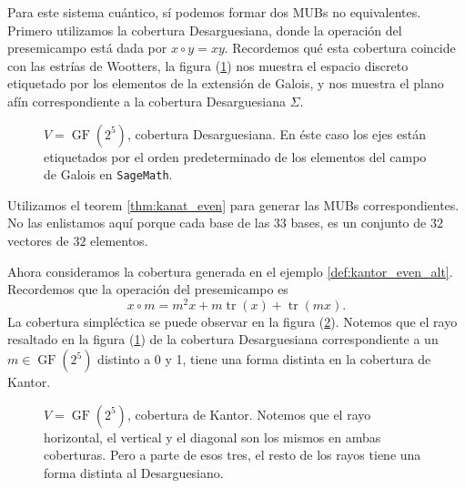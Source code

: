 \documentclass[a4paper,11pt]{report}
\DeclareMathOperator{\tr}{tr}
\DeclareMathOperator{\GF}{GF}
\begin{document}
  Para este sistema cuántico, sí podemos formar dos MUBs no
  equivalentes. Primero utilizamos la cobertura
  Desarguesiana, donde la operación del presemicampo está
  dada por $x \circ y = xy$.  Recordemos qué esta cobertura
  coincide con las estrías de Wootters, la figura
  (\ref{fig:2-5-desargues-plane}) nos muestra el espacio
  discreto etiquetado por los elementos de la extensión de
  Galois, y nos muestra el plano afín correspondiente a la
  cobertura Desarguesiana $\Sigma$.
  \begin{figure}[ht]
    \centering
    
    \caption{$V = \GF(2^{5})$, cobertura Desarguesiana. En éste
    caso los ejes están etiquetados por el orden
    predeterminado de los elementos del campo de Galois en
    \texttt{SageMath}.}
    \label{fig:2-5-desargues-plane}
  \end{figure}
  Utilizamos el teorem \ref{thm:kanat_even} para
  generar las MUBs correspondientes. No las enlistamos aquí
  porque cada base de las $33$ bases, es un conjunto de $32$ 
  vectores de $32$ elementos.

  Ahora consideramos la cobertura generada en el ejemplo
  \ref{def:kantor_even_alt}. Recordemos que la operación del
  presemicampo es
  \begin{equation}
    \label{eqn:kantor_presemi}
    x \circ m
    = m^2 x + m \tr(x) + \tr(mx).
  \end{equation} 
  La cobertura simpléctica se puede observar en la figura
  (\ref{fig:2-5-kantor-plane}).  Notemos que el rayo
  resaltado en la figura (\ref{fig:2-5-desargues-plane}) de
  la cobertura Desarguesiana correspondiente a un $m \in
  \GF(2^{5})$ distinto a 0 y 1, tiene una forma distinta en
  la cobertura de Kantor.
  \begin{figure}[ht]
    \centering
    
    \caption{$V = \GF(2^{5})$, cobertura de Kantor. Notemos
      que el rayo horizontal, el vertical y el diagonal son
      los mismos en ambas coberturas. Pero a parte de esos
      tres, el resto de los rayos tiene una forma distinta
      al Desarguesiano.}
    \label{fig:2-5-kantor-plane}
  \end{figure}
  
\end{document}
